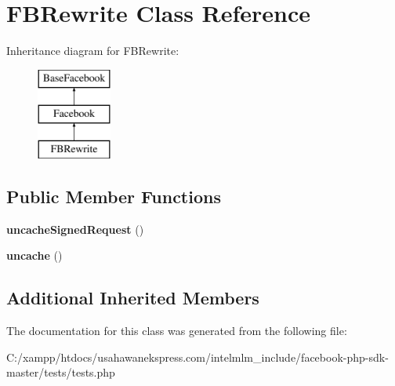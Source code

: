 \hypertarget{class_f_b_rewrite}{\section{F\-B\-Rewrite Class Reference}
\label{class_f_b_rewrite}
}
Inheritance diagram for F\-B\-Rewrite\-:\begin{figure}[H]
\begin{center}
\leavevmode
\includegraphics[height=3.000000cm]{class_f_b_rewrite}
\end{center}
\end{figure}
\subsection*{Public Member Functions}
\begin{DoxyCompactItemize}
\item 
\hypertarget{class_f_b_rewrite_ac82f136f652cf46fc24173e0e9e31bbe}{{\bfseries uncache\-Signed\-Request} ()}\label{class_f_b_rewrite_ac82f136f652cf46fc24173e0e9e31bbe}

\item 
\hypertarget{class_f_b_rewrite_a291bdad3af19f8a1bd0afcd05d153f12}{{\bfseries uncache} ()}\label{class_f_b_rewrite_a291bdad3af19f8a1bd0afcd05d153f12}

\end{DoxyCompactItemize}
\subsection*{Additional Inherited Members}


The documentation for this class was generated from the following file\-:\begin{DoxyCompactItemize}
\item 
C\-:/xampp/htdocs/usahawanekspress.\-com/intelmlm\-\_\-include/facebook-\/php-\/sdk-\/master/tests/tests.\-php\end{DoxyCompactItemize}
